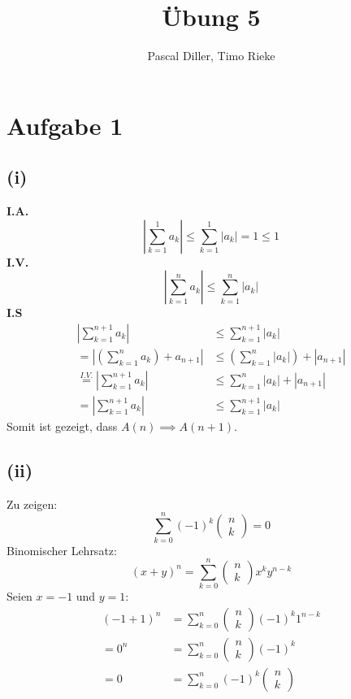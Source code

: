 \documentclass{article}
\title{Übung 5}
\author{Pascal Diller, Timo Rieke}
\begin{document}
\maketitle
\section{Aufgabe 1}
\subsection{(i)}
\textbf{I.A.}
\[\left|\sum_{k=1}^{1} a_k\right| \leq \sum_{k=1}^{1} |a_k| = 1 \leq 1\]
\textbf{I.V.}
\[\left|\sum_{k=1}^{n} a_k\right| \leq \sum_{k=1}^{n}|a_k|\]
\textbf{I.S}
\begin{align*}
    |\sum_{k=1}^{n+1} a_k| &\leq \sum_{k=1}^{n+1} |a_k| \\
    = \left|\left(\sum_{k=1}^{n}a_k\right) + a_{n+1}\right| &\leq \left(\sum_{k=1}^{n}|a_k|\right) + |a_{n+1}| \\
    \overset{I.V.}{=} \left|\sum_{k=1}^{n+1} a_k\right| &\leq \sum_{k=1}^{n}|a_k| + |a_{n+1}| \\
    = \left|\sum_{k=1}^{n+1}a_k\right| &\leq \sum_{k=1}^{n+1}|a_k| 
\end{align*}
Somit ist gezeigt, dass $A(n) \implies A(n+1)$.
\newpage
\subsection{(ii)}
Zu zeigen: \[\sum_{k=0}^{n}(-1)^k \begin{pmatrix} n\\k \end{pmatrix} = 0\]
Binomischer Lehrsatz: \[(x+y)^n = \sum_{k=0}^{n} \begin{pmatrix}n\\k \end{pmatrix} x^k y^{n-k}\]
Seien $x = -1$ und $y = 1$:
\begin{align*}
    (-1 + 1)^n &= \sum_{k=0}^{n} \begin{pmatrix}n\\k\end{pmatrix}(-1)^k 1^{n-k} \\
    = 0^n &= \sum_{k=0}^{n} \begin{pmatrix}n\\k\end{pmatrix} (-1)^k \\
    = 0 &= \sum_{k=0}^{n}(-1)^k \begin{pmatrix}n\\k\end{pmatrix}
\end{align*}
\end{document}
